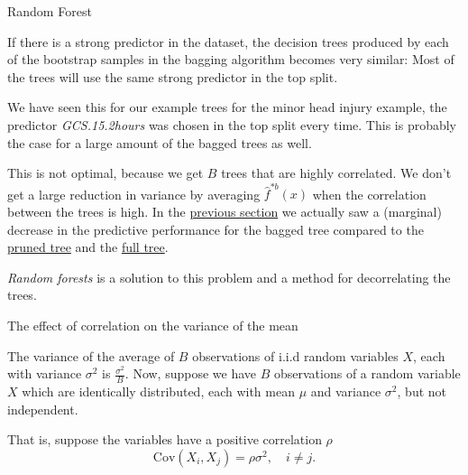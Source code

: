 \documentclass[ignorenonframetext,]{beamer}
\begin{document}
\begin{frame}{Random Forest}

If there is a strong predictor in the dataset, the decision trees
produced by each of the bootstrap samples in the bagging algorithm
becomes very similar: Most of the trees will use the same strong
predictor in the top split.

We have seen this for our example trees for the minor head injury
example, the predictor \emph{GCS.15.2hours} was chosen in the top split
every time. This is probably the case for a large amount of the bagged
trees as well.

This is not optimal, because we get \(B\) trees that are highly
correlated. We don't get a large reduction in variance by averaging
\(\hat{f}^{*b}(x)\) when the correlation between the trees is high. In
the \protect\hyperlink{bagex}{previous section} we actually saw a
(marginal) decrease in the predictive performance for the bagged tree
compared to the \protect\hyperlink{expruning}{pruned tree} and the
\protect\hyperlink{classtree2}{full tree}.

\emph{Random forests} is a solution to this problem and a method for
decorrelating the trees.

\end{frame}

\begin{frame}

\begin{block}{The effect of correlation on the variance of the mean}

The variance of the average of \(B\) observations of i.i.d random
variables \(X\), each with variance \(\sigma^2\) is
\(\frac{\sigma^2}{B}\). Now, suppose we have \(B\) observations of a
random variable \(X\) which are identically distributed, each with mean
\(\mu\) and variance \(\sigma^2\), but not independent.

That is, suppose the variables have a positive correlation \(\rho\)
\[\text{Cov}(X_i, X_j) = \rho \sigma^2, \quad i \neq j.\]

\end{block}

\end{frame}
\end{document}
